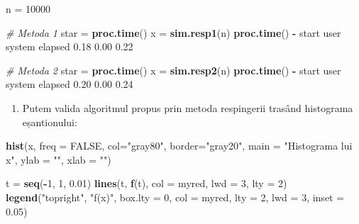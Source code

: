 \documentclass[]{article}
\newenvironment{Shaded}{\begin{snugshade}}{\end{snugshade}}
\newcommand{\KeywordTok}[1]{\textcolor[rgb]{0.13,0.29,0.53}{\textbf{#1}}}
\newcommand{\DataTypeTok}[1]{\textcolor[rgb]{0.13,0.29,0.53}{#1}}
\newcommand{\DecValTok}[1]{\textcolor[rgb]{0.00,0.00,0.81}{#1}}
\newcommand{\FloatTok}[1]{\textcolor[rgb]{0.00,0.00,0.81}{#1}}
\newcommand{\StringTok}[1]{\textcolor[rgb]{0.31,0.60,0.02}{#1}}
\newcommand{\CommentTok}[1]{\textcolor[rgb]{0.56,0.35,0.01}{\textit{#1}}}
\newcommand{\OtherTok}[1]{\textcolor[rgb]{0.56,0.35,0.01}{#1}}
\newcommand{\OperatorTok}[1]{\textcolor[rgb]{0.81,0.36,0.00}{\textbf{#1}}}
\newcommand{\NormalTok}[1]{#1}
\providecommand{\tightlist}{%
  \setlength{\itemsep}{0pt}\setlength{\parskip}{0pt}}
\begin{document}
\begin{Shaded}
\begin{Highlighting}[]
\NormalTok{n =}\StringTok{ }\DecValTok{10000}

\CommentTok{# Metoda 1}
\NormalTok{star =}\StringTok{ }\KeywordTok{proc.time}\NormalTok{()}
\NormalTok{x =}\StringTok{ }\KeywordTok{sim.resp1}\NormalTok{(n)}
\KeywordTok{proc.time}\NormalTok{() }\OperatorTok{-}\StringTok{ }\NormalTok{start}
\NormalTok{   user  system elapsed }
   \FloatTok{0.18}    \FloatTok{0.00}    \FloatTok{0.22} 

\CommentTok{# Metoda 2}
\NormalTok{star =}\StringTok{ }\KeywordTok{proc.time}\NormalTok{()}
\NormalTok{x =}\StringTok{ }\KeywordTok{sim.resp2}\NormalTok{(n)}
\KeywordTok{proc.time}\NormalTok{() }\OperatorTok{-}\StringTok{ }\NormalTok{start}
\NormalTok{   user  system elapsed }
   \FloatTok{0.20}    \FloatTok{0.00}    \FloatTok{0.24} 
\end{Highlighting}
\end{Shaded}

\begin{enumerate}
\def\labelenumi{\arabic{enumi}.}
\setcounter{enumi}{1}
\tightlist
\item
  Putem valida algoritmul propus prin metoda respingerii trasând
  histograma eșantionului:
\end{enumerate}

\begin{Shaded}
\begin{Highlighting}[]
\KeywordTok{hist}\NormalTok{(x, }\DataTypeTok{freq =} \OtherTok{FALSE}\NormalTok{, }
     \DataTypeTok{col=}\StringTok{"gray80"}\NormalTok{, }
     \DataTypeTok{border=}\StringTok{"gray20"}\NormalTok{,}
     \DataTypeTok{main =} \StringTok{"Histograma lui x"}\NormalTok{, }\DataTypeTok{ylab =} \StringTok{""}\NormalTok{, }
     \DataTypeTok{xlab =} \StringTok{""}\NormalTok{)}

\NormalTok{t =}\StringTok{ }\KeywordTok{seq}\NormalTok{(}\OperatorTok{-}\DecValTok{1}\NormalTok{, }\DecValTok{1}\NormalTok{, }\FloatTok{0.01}\NormalTok{)}
\KeywordTok{lines}\NormalTok{(t, }\KeywordTok{f}\NormalTok{(t), }
      \DataTypeTok{col =}\NormalTok{ myred, }\DataTypeTok{lwd =} \DecValTok{3}\NormalTok{, }\DataTypeTok{lty =} \DecValTok{2}\NormalTok{)}
\KeywordTok{legend}\NormalTok{(}\StringTok{"topright"}\NormalTok{, }
       \StringTok{"f(x)"}\NormalTok{, }
       \DataTypeTok{box.lty =} \DecValTok{0}\NormalTok{,}
       \DataTypeTok{col =}\NormalTok{ myred, }
       \DataTypeTok{lty =} \DecValTok{2}\NormalTok{, }\DataTypeTok{lwd =} \DecValTok{3}\NormalTok{, }\DataTypeTok{inset =} \FloatTok{0.05}\NormalTok{)}
\end{Highlighting}
\end{Shaded}
\end{document}
